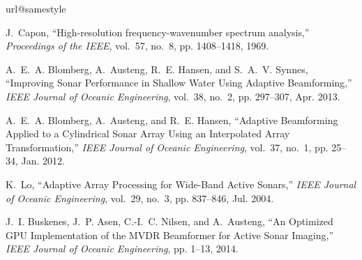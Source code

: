 \documentclass[10pt,journal,draftclsnofoot,onecolumn]{IEEEtran}
\newcommand\1{\vec 1}
\providecommand{\DIFdelbegin}{} %
\providecommand{\DIFdelend}{} %
\begin{document}
\ifCLASSOPTIONcaptionsoff
  \newpage
\fi

\ifBuildBibliography
   
   \DIFdelbegin %
\DIFdelend 


\else

\begin{thebibliography}{10}
\providecommand{\url}[1]{#1}
\csname url@samestyle\endcsname
\providecommand{\newblock}{\relax}
\providecommand{\bibinfo}[2]{#2}
\providecommand{\BIBentrySTDinterwordspacing}{\spaceskip=0pt\relax}
\providecommand{\BIBentryALTinterwordstretchfactor}{4}
\providecommand{\BIBentryALTinterwordspacing}{\spaceskip=\fontdimen2\font plus
\BIBentryALTinterwordstretchfactor\fontdimen3\font minus
  \fontdimen4\font\relax}
\providecommand{\BIBforeignlanguage}[2]{{%
\expandafter\ifx\csname l@#1\endcsname\relax
\typeout{** WARNING: IEEEtran.bst: No hyphenation pattern has been}%
\typeout{** loaded for the language `#1'. Using the pattern for}%
\typeout{** the default language instead.}%
\else
\language=\csname l@#1\endcsname
\fi
#2}}
\providecommand{\BIBdecl}{\relax}
\BIBdecl

J.~Capon, ``{High-resolution frequency-wavenumber spectrum analysis},''
  \emph{Proceedings of the IEEE}, vol.~57, no.~8, pp. 1408--1418, 1969.

A.~E.~A. Blomberg, A.~Austeng, R.~E. Hansen, and S.~A.~V. Synnes, ``{Improving
  Sonar Performance in Shallow Water Using Adaptive Beamforming},'' \emph{IEEE
  Journal of Oceanic Engineering}, vol.~38, no.~2, pp. 297--307, Apr. 2013.

A.~E.~A. Blomberg, A.~Austeng, and R.~E. Hansen, ``{Adaptive Beamforming
  Applied to a Cylindrical Sonar Array Using an Interpolated Array
  Transformation},'' \emph{IEEE Journal of Oceanic Engineering}, vol.~37,
  no.~1, pp. 25--34, Jan. 2012.

K.~Lo, ``{Adaptive Array Processing for Wide-Band Active Sonars},'' \emph{IEEE
  Journal of Oceanic Engineering}, vol.~29, no.~3, pp. 837--846, Jul. 2004.

J.~I. Buskenes, J.~P. Asen, C.-I.~C. Nilsen, and A.~Austeng, ``{An Optimized
  GPU Implementation of the MVDR Beamformer for Active Sonar Imaging},''
  \emph{IEEE Journal of Oceanic Engineering}, pp. 1--13, 2014.


\end{thebibliography}
\end{document}
